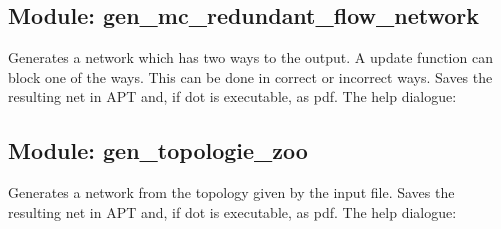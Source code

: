 \subsection*{Module: gen\_mc\_redundant\_flow\_network}
Generates a network which has two ways to the output. A update function can block one of the ways. This can be done in correct or incorrect ways. Saves the resulting net in APT and, if dot is executable, as pdf. The help dialogue: 

\subsection*{Module: gen\_topologie\_zoo}
Generates a network from the topology given by the input file. Saves the resulting net in APT and, if dot is executable, as pdf. The help dialogue: 


